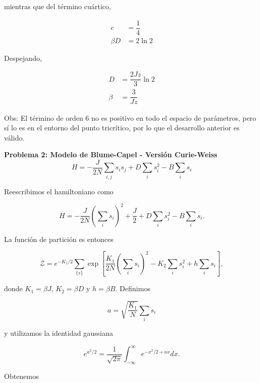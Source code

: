 \documentclass[10pt]{article}
\begin{document}
mientras que del t\'ermino cu\'artico,

\begin{align*}
c &= \dfrac{1}{4} \\
\beta D &= 2 \ln 2
\end{align*}

Despejando,

\begin{align*}
D &= \dfrac{2Jz}{3}\ln 2 \\
\beta &= \dfrac{3}{Jz} 
\end{align*}

Obs: El t\'ermino de orden 6 no es positivo en todo el espacio de par\'ametros, pero s\'i lo es en el entorno del punto tricr\'itico, por lo que el desarrollo anterior es v\'alido.

\pagebreak

\textbf{Problema 2: Modelo de Blume-Capel - Versi\'on Curie-Weiss}
\\


\begin{equation}
H = -\dfrac{J}{2N} \sum_{i,j} s_i s_j + D \sum_i s_i^2 - B\sum_i s_i
\end{equation}

Reescribimos el hamiltoniano como

\begin{equation}
H = -\dfrac{J}{2N} \left(\sum_i s_i \right)^2 + \dfrac{J}{2} + D \sum_i s_i^2 - B\sum_i s_i.
\end{equation}

La funci\'on de partici\'on es entonces 

\begin{equation}
\mathcal{Z} = e^{-K_1/2} \sum_{\lbrace s \rbrace} \exp \left[ \dfrac{K_1}{2N} \left(\sum_i s_i \right)^2 - K_2 \sum_i s_i^2 + h \sum_i s_i \right],
\end{equation}

donde $K_1 = \beta J$, $K_2 = \beta D$ y $h = \beta B$. Definimos 

\begin{equation}
a = \sqrt{\dfrac{K_1}{N}} \sum_i s_i
\end{equation}

y utilizamos la identidad gaussiana

\begin{equation}
e^{a^2/2} = \dfrac{1}{\sqrt{2\pi}}\int_{-\infty}^{\infty} e^{-x^2/2+ax} dx.
\end{equation}

Obtenemos
\end{document}
